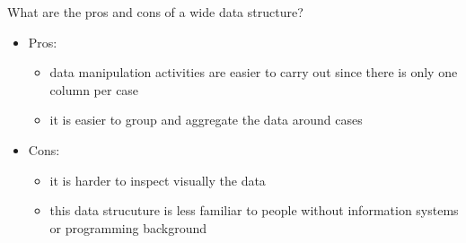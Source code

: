 \documentclass[a4paper,11pt]{book}
\numberwithin{figure}{chapter}
\numberwithin{table}{chapter}
\newcommand{\question}[1]{%
    \begin{tcolorbox}[colback=comp_c!10,colframe=comp_c,sidebyside align=top,width=\linewidth,before skip=1ex]
        #1
    \end{tcolorbox}
    \switchcolumn%
}
\newcommand{\note}[1]{%
    \begin{tcolorbox}[colback=white!0,colframe=white!10,width=\linewidth,before skip=1ex]
        #1
    \end{tcolorbox}
}
\begin{document}
\begin{paracol}{2}
	\question{
		\raggedright What are the pros and cons of a wide data structure?
	}
	\note{
		\begin{itemize}
			\item Pros:
			\begin{itemize}
				\item data manipulation activities are easier to carry out since there is only one column per case
				\item it is easier to group and aggregate the data around cases
			\end{itemize}
			\item Cons:
			\begin{itemize}
				\item it is harder to inspect visually the data
				\item this data strucuture is less familiar to people without information systems or programming background
			\end{itemize}
		\end{itemize}
		}
\end{paracol}
\end{document}
